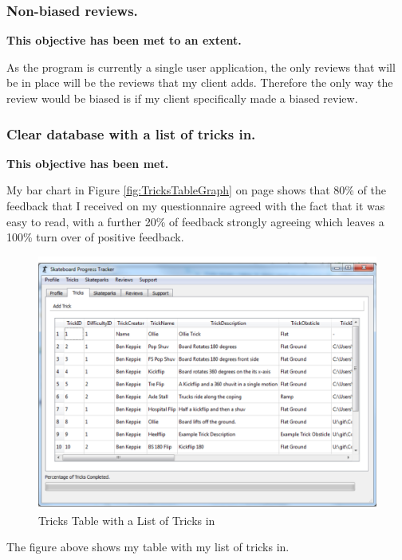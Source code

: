 \subsubsection{Non-biased reviews.}

\textbf{This objective has been met to an extent.}

As the program is currently a single user application, the only reviews that will be in place will be the reviews that my client adds. Therefore the only way the review would be biased is if my client specifically made a biased review. 



\subsubsection{Clear database with a list of tricks in.} 

\textbf{This objective has been met.}

My bar chart in Figure \ref{fig:TricksTableGraph} on page \pageref{fig:TricksTableGraph} shows that 80\% of the feedback that I received on my questionnaire agreed with the fact that it was easy to read, with a further 20\% of feedback strongly agreeing which leaves a 100\% turn over of positive feedback.


\begin{figure}[H]
    \includegraphics[width=\textwidth]{./Evaluation/images/TricksTableNFS.pdf}
    \caption{Tricks Table with a List of Tricks in} \label{fig:TricksTableEX}
\end{figure}

The figure above shows my table with my list of tricks in.







